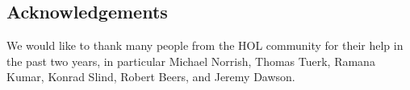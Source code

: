 \subsection*{Acknowledgements}

We would like to thank many people from the HOL community
for their help in the past two years, in particular 
Michael Norrish, Thomas Tuerk, 
Ramana Kumar, Konrad Slind, Robert Beers, and Jeremy Dawson. 
